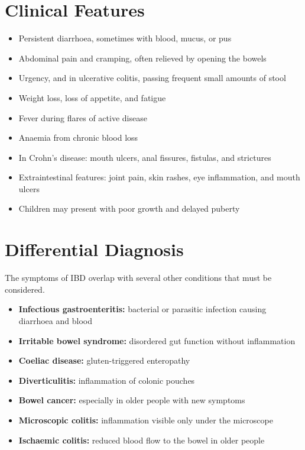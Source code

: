 \section*{Clinical Features}
\begin{itemize}
    \item Persistent diarrhoea, sometimes with blood, mucus, or pus
    \item Abdominal pain and cramping, often relieved by opening the bowels
    \item Urgency, and in ulcerative colitis, passing frequent small amounts of stool
    \item Weight loss, loss of appetite, and fatigue
    \item Fever during flares of active disease
    \item Anaemia from chronic blood loss
    \item In Crohn's disease: mouth ulcers, anal fissures, fistulas, and strictures
    \item Extraintestinal features: joint pain, skin rashes, eye inflammation, and mouth ulcers
    \item Children may present with poor growth and delayed puberty
\end{itemize}

\section*{Differential Diagnosis}
The symptoms of IBD overlap with several other conditions that must be considered.
\begin{itemize}
    \item \textbf{Infectious gastroenteritis:} bacterial or parasitic infection causing diarrhoea and blood
    \item \textbf{Irritable bowel syndrome:} disordered gut function without inflammation
    \item \textbf{Coeliac disease:} gluten-triggered enteropathy
    \item \textbf{Diverticulitis:} inflammation of colonic pouches
    \item \textbf{Bowel cancer:} especially in older people with new symptoms
    \item \textbf{Microscopic colitis:} inflammation visible only under the microscope
    \item \textbf{Ischaemic colitis:} reduced blood flow to the bowel in older people
\end{itemize}

